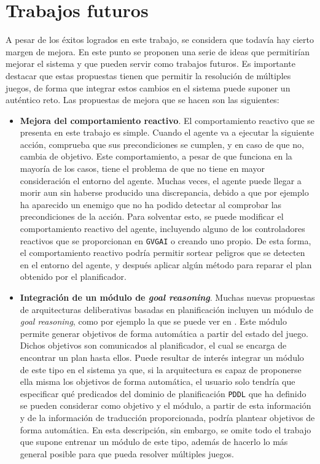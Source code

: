 \section{Trabajos futuros}

A pesar de los éxitos logrados en este trabajo, se considera que todavía hay cierto margen
de mejora. En este punto se proponen una serie de ideas que permitirían mejorar el sistema y
que pueden servir como trabajos futuros. Es importante destacar que estas propuestas tienen
que permitir la resolución de múltiples juegos, de forma que integrar estos cambios en el
sistema puede suponer un auténtico reto. Las propuestas de mejora que se hacen son las siguientes:

\begin{itemize}[label=\textbullet]
    \item \textbf{Mejora del comportamiento reactivo}. El comportamiento reactivo que se
    presenta en este trabajo es simple. Cuando el agente va a ejecutar la siguiente acción,
    comprueba que sus precondiciones se cumplen, y en caso de que no, cambia de objetivo.
    Este comportamiento, a pesar de que funciona en la mayoría de los casos, tiene el problema
    de que no tiene en mayor consideración el entorno del agente. Muchas veces, el agente
    puede llegar a morir aun sin haberse producido una discrepancia, debido a que por ejemplo
    ha aparecido un enemigo que no ha podido detectar al comprobar las precondiciones de la acción.
    Para solventar esto, se puede modificar el comportamiento reactivo del agente, incluyendo alguno
    de los controladores reactivos que se proporcionan en \texttt{GVGAI} o creando uno propio. De esta
    forma, el comportamiento reactivo podría permitir sortear peligros que se detecten en el entorno
    del agente, y después aplicar algún método para reparar el plan obtenido por el planificador.
    \item \textbf{Integración de un módulo de \textit{goal reasoning}}. Muchas nuevas propuestas de
    arquitecturas deliberativas basadas en planificación incluyen un módulo de \textit{goal reasoning},
    como por ejemplo la que se puede ver en \cite{Aha_2018}. Este módulo permite generar objetivos
    de forma automática a partir del estado del juego. Dichos objetivos son comunicados al planificador,
    el cual se encarga de encontrar un plan hasta ellos. Puede resultar de interés integrar un módulo
    de este tipo en el sistema ya que, si la arquitectura es capaz de proponerse ella misma los objetivos
    de forma automática, el usuario solo tendría que especificar qué predicados del dominio de planificación
    \texttt{PDDL} que ha definido se pueden considerar como objetivo y el módulo, a partir de esta
    información y de la información de traducción proporcionada, podría plantear objetivos de forma automática.
    En esta descripción, sin embargo, se omite todo el trabajo que supone entrenar un módulo de este
    tipo, además de hacerlo lo más general posible para que pueda resolver múltiples juegos.
\end{itemize}